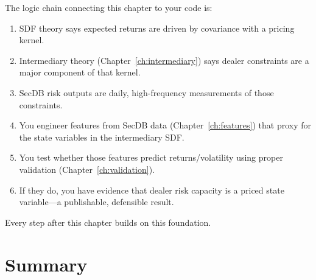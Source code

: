 \begin{keyidea}
The logic chain connecting this chapter to your code is:
\begin{enumerate}[nosep]
  \item SDF theory says expected returns are driven by covariance with a pricing kernel.
  \item Intermediary theory (Chapter~\ref{ch:intermediary}) says dealer constraints are a major component of that kernel.
  \item SecDB risk outputs are daily, high-frequency measurements of those constraints.
  \item You engineer features from SecDB data (Chapter~\ref{ch:features}) that proxy for the state variables in the intermediary SDF.
  \item You test whether those features predict returns/volatility using proper validation (Chapter~\ref{ch:validation}).
  \item If they do, you have evidence that dealer risk capacity is a priced state variable---a publishable, defensible result.
\end{enumerate}
Every step after this chapter builds on this foundation.
\end{keyidea}

\section{Summary}
\label{sec:ch1-summary}

